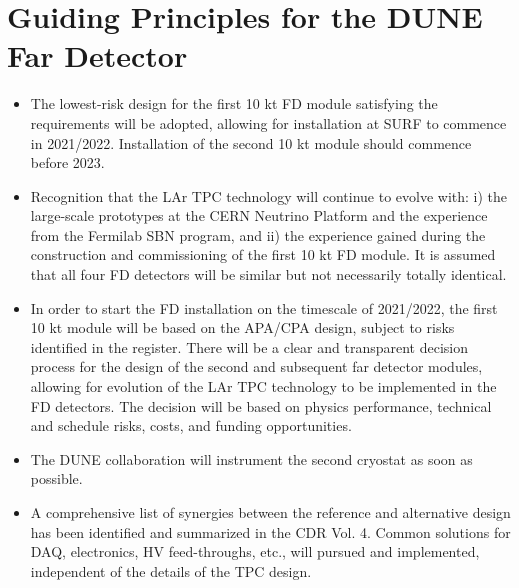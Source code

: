 \section{Guiding Principles for the DUNE Far Detector}

\begin{itemize}
\item The lowest-risk design for the first 10 kt FD module satisfying the requirements 
will be adopted, allowing for installation at SURF to commence in 2021/2022. Installation 
of the second 10 kt module should commence before 2023.

\item  Recognition that the LAr TPC technology will continue to evolve with: i) the 
large-scale prototypes at the CERN Neutrino Platform and the experience from the 
Fermilab SBN program, and ii) the experience gained during the construction and 
commissioning of the first 10 kt FD module. It is assumed that all four FD detectors 
will be similar but not necessarily totally identical.

\item  In order to start the FD installation on the timescale of 2021/2022, the first 
10 kt module will be based on the APA/CPA design, subject to risks identified in 
the register. There will be a clear and transparent decision process for the design 
of the second and subsequent far detector modules, allowing for evolution of the 
LAr TPC technology to be implemented in the FD detectors. The decision will be 
based on physics performance, technical and schedule risks, costs, and funding 
opportunities.

\item The DUNE collaboration will instrument the second cryostat as soon as possible.

\item A comprehensive list of synergies between the reference and alternative design 
has been identified and summarized in the CDR Vol. 4. Common solutions for DAQ, 
electronics, HV feed-throughs, etc., will pursued and implemented, independent 
of the details of the TPC design.

\end{itemize}

